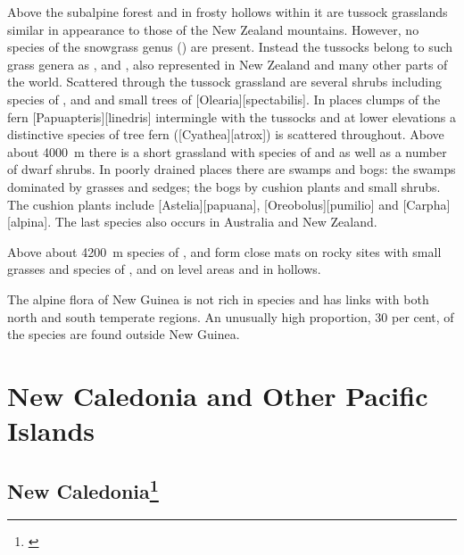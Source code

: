 Above the subalpine forest and in frosty hollows within it are tussock grasslands similar in appearance to those of the New Zealand mountains.
However, no species of the snowgrass genus () are present.
Instead the tussocks belong to such grass genera as ,  and , also represented in New Zealand and many other parts of the world.
Scattered through the tussock grassland are several shrubs including species of ,  and  and small trees of [Olearia][spectabilis].
In places clumps of the fern [Papuapteris][linedris] intermingle with the tussocks and at lower elevations a distinctive species of tree fern ([Cyathea][atrox]) is scattered throughout.
Above about \SI{4000}{\metre} there is a short grassland with species of  and  as well as a number of dwarf shrubs.
In poorly drained places there are swamps and bogs: the swamps dominated by grasses and sedges; the bogs by cushion plants and small shrubs.
The cushion plants include [Astelia][papuana], [Oreobolus][pumilio] and [Carpha][alpina].
The last species also occurs in Australia and New Zealand.

Above about \SI{4200}{\metre} species of ,  and  form close mats on rocky sites with small grasses and species of ,  and  on level areas and in hollows.

The alpine flora of New Guinea is not rich in species and has links with both north and south temperate regions.
An unusually high proportion, 30 per cent, of the species are found outside New Guinea.

\section{New Caledonia and Other Pacific Islands}

\subsection[New Caledonia]{New Caledonia\thinspace\footnote{\cite{schmid1981fleurs}}}

